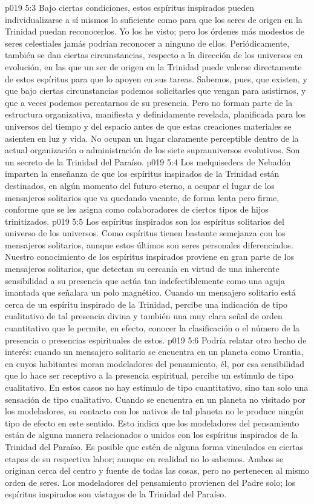 \vs p019 5:3 Bajo ciertas condiciones, estos espíritus inspirados pueden individualizarse a sí mismos lo suficiente como para que los seres de origen en la Trinidad puedan reconocerlos. Yo los he visto; pero los órdenes más modestos de seres celestiales jamás podrían reconocer a ninguno de ellos. Periódicamente, también se dan ciertas circunstancias, respecto a la dirección de los universos en evolución, en las que un ser de origen en la Trinidad puede valerse directamente de estos espíritus para que lo apoyen en sus tareas. Sabemos, pues, que existen, y que bajo ciertas circunstancias podemos solicitarles que vengan para asistirnos, y que a veces podemos percatarnos de su presencia. Pero no forman parte de la estructura organizativa, manifiesta y definidamente revelada, planificada para los universos del tiempo y del espacio antes de que estas creaciones materiales se asienten en luz y vida. No ocupan un lugar claramente perceptible dentro de la actual organización o administración de los siete suprauniversos evolutivos. Son un secreto de la Trinidad del Paraíso.
\vs p019 5:4 Los melquisedecs de Nebadón imparten la enseñanza de que los espíritus inspirados de la Trinidad están destinados, en algún momento del futuro eterno, a ocupar el lugar de los mensajeros solitarios que va quedando vacante, de forma lenta pero firme, conforme que se les asigna como colaboradores de ciertos tipos de hijos trinitizados.
\vs p019 5:5 \pc Los espíritus inspirados son los espíritus solitarios del universo de los universos. Como espíritus tienen bastante semejanza con los mensajeros solitarios, aunque estos últimos son seres personales diferenciados. Nuestro conocimiento de los espíritus inspirados proviene en gran parte de los mensajeros solitarios, que detectan su cercanía en virtud de una inherente sensibilidad a su presencia que actúa tan indefectiblemente como una aguja imantada que señalara un polo magnético. Cuando un mensajero solitario está cerca de un espíritu inspirado de la Trinidad, percibe una indicación de tipo cualitativo de tal presencia divina y también una muy clara señal de orden cuantitativo que le permite, en efecto, conocer la clasificación o el número de la presencia o presencias espirituales de estos.
\vs p019 5:6 Podría relatar otro hecho de interés: cuando un mensajero solitario se encuentra en un planeta como Urantia, en cuyos habitantes moran modeladores del pensamiento, él, por esa sensibilidad que lo hace ser receptivo a la presencia espiritual, percibe un estímulo de tipo cualitativo. En estos casos no hay estímulo de tipo cuantitativo, sino tan solo una sensación de tipo cualitativo. Cuando se encuentra en un planeta no visitado por los modeladores, su contacto con los nativos de tal planeta no le produce ningún tipo de efecto en este sentido. Esto indica que los modeladores del pensamiento están de alguna manera relacionados o unidos con los espíritus inspirados de la Trinidad del Paraíso. Es posible que estén de alguna forma vinculados en ciertas etapas de su respectiva labor; aunque en realidad no lo sabemos. Ambos se originan cerca del centro y fuente de todas las cosas, pero no pertenecen al mismo orden de seres. Los modeladores del pensamiento provienen del Padre solo; los espíritus inspirados son vástagos de la Trinidad del Paraíso.
